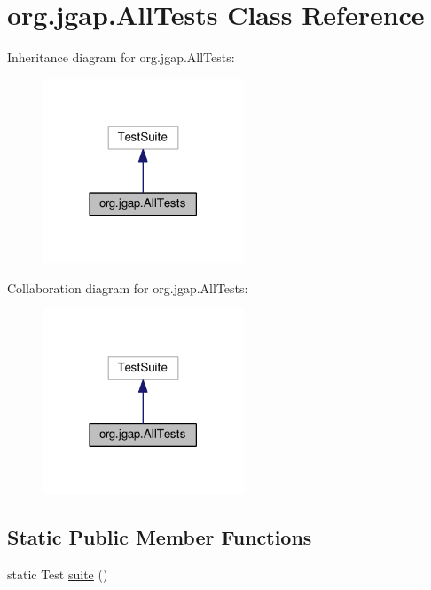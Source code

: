 \hypertarget{classorg_1_1jgap_1_1_all_tests}{\section{org.\-jgap.\-All\-Tests Class Reference}
\label{classorg_1_1jgap_1_1_all_tests}
}


Inheritance diagram for org.\-jgap.\-All\-Tests\-:
\nopagebreak
\begin{figure}[H]
\begin{center}
\leavevmode
\includegraphics[width=170pt]{classorg_1_1jgap_1_1_all_tests__inherit__graph}
\end{center}
\end{figure}


Collaboration diagram for org.\-jgap.\-All\-Tests\-:
\nopagebreak
\begin{figure}[H]
\begin{center}
\leavevmode
\includegraphics[width=170pt]{classorg_1_1jgap_1_1_all_tests__coll__graph}
\end{center}
\end{figure}
\subsection*{Static Public Member Functions}
\begin{DoxyCompactItemize}
\item 
static Test \hyperlink{classorg_1_1jgap_1_1_all_tests_a25dabed5e6b67f11150a9d334ddfaeb9}{suite} ()
\end{DoxyCompactItemize}
